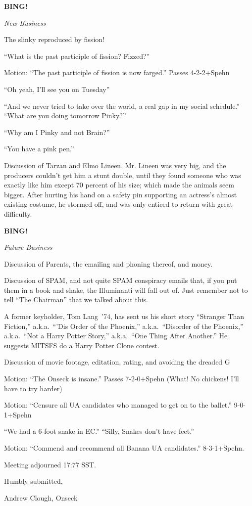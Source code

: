 \documentclass[12pt]{article}
\newcommand{\bing}{{\bf BING!} }
\newcommand{\goto}[1]{\bing \vskip 12pt \centerline{{\em{#1}}}}
\begin{document}
\goto{New Business}

The slinky reproduced by fission!

``What is the past participle of fission?  Fizzed?''

Motion:  ``The past participle of fission is now farged.'' Passes 4-2-2+Spehn

``Oh yeah, I'll see you on Tuesday''

``And we never tried to take over the world, a real gap in my social schedule.''
``What are you doing tomorrow Pinky?''

``Why am I Pinky and not Brain?''

``You have a pink pen.''

Discussion of Tarzan and Elmo Lineen.  Mr. Lineen was very big, and the producers couldn't get him a stunt double, until they found someone who was exactly like him except 70 percent of his size; which made the animals seem bigger.  After hurting his hand on a safety pin supporting an actress's almost existing costume, he stormed off, and was only enticed to return with great difficulty.

\goto{Future Business}

Discussion of Parents, the emailing and phoning thereof, and money.

Discussion of SPAM, and not quite SPAM conspiracy emails that, if you put them in a book and shake, the Illuminanti will fall out of.  Just remember not to tell ``The Chairman'' that we talked about this.

A former keyholder, Tom Lang~'74, has sent us his short story ``Stranger Than
Fiction,'' a.k.a.~``'Dis Order of the Phoenix,'' a.k.a.~``Disorder of the
Phoenix,'' a.k.a.~``Not a Harry Potter Story,'' a.k.a.~``One Thing After
Another.''  He suggests MITSFS do a Harry Potter Clone contest.

Discussion of movie footage, editation, rating, and avoiding the dreaded G

Motion:  ``The Onseck is insane.''  Passes 7-2-0+Spehn  (What! No chickens!  I'll have to try harder)

Motion:  ``Censure all UA candidates who managed to get on to the ballet.'' 9-0-1+Spehn

``We had a 6-foot snake in EC.''  ``Silly, Snakes don't have feet.''

Motion:  ``Commend and recommend all Banana UA candidates.''  8-3-1+Spehn.

\vspace{12pt}

\noindent
Meeting adjourned 17:77 SST.

\vspace{18pt}

\centerline{Humbly submitted,}
\centerline{Andrew Clough, Onseck}
\end{document}
